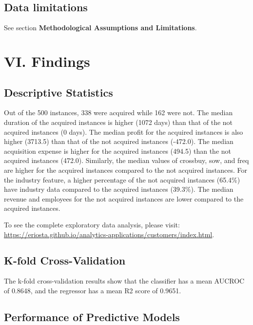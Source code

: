 \hypertarget{data-limitations}{%
\subsection{Data limitations}\label{data-limitations}}

See section \textbf{Methodological Assumptions and Limitations}.

\hypertarget{vi-findings}{%
\section{VI. Findings}\label{vi-findings}}

\hypertarget{descriptive-statistics}{%
\subsection{Descriptive Statistics}\label{descriptive-statistics}}

Out of the 500 instances, 338 were acquired while 162 were not. The
median duration of the acquired instances is higher (1072 days) than
that of the not acquired instances (0 days). The median profit for the
acquired instances is also higher (3713.5) than that of the not acquired
instances (-472.0). The median acquisition expense is higher for the
acquired instances (494.5) than the not acquired instances (472.0).
Similarly, the median values of crossbuy, sow, and freq are higher for
the acquired instances compared to the not acquired instances. For the
industry feature, a higher percentage of the not acquired instances
(65.4\%) have industry data compared to the acquired instances (39.3\%).
The median revenue and employees for the not acquired instances are
lower compared to the acquired instances.

To see the complete exploratory data analysis, please visit:
\url{https://eriosta.github.io/analytics-applications/customers/index.html}.

\hypertarget{k-fold-cross-validation}{%
\subsection{K-fold Cross-Validation}\label{k-fold-cross-validation}}

The k-fold cross-validation results show that the classifier has a mean
AUCROC of 0.8648, and the regressor has a mean R2 score of 0.9651.

\hypertarget{performance-of-predictive-models}{%
\subsection{Performance of Predictive
Models}\label{performance-of-predictive-models}}

